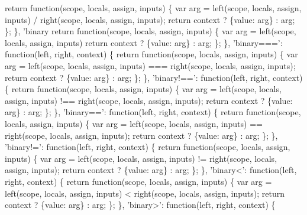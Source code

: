 \begin{DoxyCodeInclude}
{{{    \textcolor{keywordflow}{return} \textcolor{keyword}{function}(scope, locals, assign, inputs) \{
      var arg = left(scope, locals, assign, inputs) / right(scope, locals, assign, inputs);
      \textcolor{keywordflow}{return} context ? \{value: arg\} : arg;
    \};
  \},
  \textcolor{stringliteral}{'binary%
    \textcolor{keywordflow}{return} \textcolor{keyword}{function}(scope, locals, assign, inputs) \{
      var arg = left(scope, locals, assign, inputs) %
      \textcolor{keywordflow}{return} context ? \{value: arg\} : arg;
    \};
  \},
  \textcolor{stringliteral}{'binary==='}: \textcolor{keyword}{function}(left, right, context) \{
    \textcolor{keywordflow}{return} \textcolor{keyword}{function}(scope, locals, assign, inputs) \{
      var arg = left(scope, locals, assign, inputs) === right(scope, locals, assign, inputs);
      \textcolor{keywordflow}{return} context ? \{value: arg\} : arg;
    \};
  \},
  \textcolor{stringliteral}{'binary!=='}: \textcolor{keyword}{function}(left, right, context) \{
    \textcolor{keywordflow}{return} \textcolor{keyword}{function}(scope, locals, assign, inputs) \{
      var arg = left(scope, locals, assign, inputs) !== right(scope, locals, assign, inputs);
      \textcolor{keywordflow}{return} context ? \{value: arg\} : arg;
    \};
  \},
  \textcolor{stringliteral}{'binary=='}: \textcolor{keyword}{function}(left, right, context) \{
    \textcolor{keywordflow}{return} \textcolor{keyword}{function}(scope, locals, assign, inputs) \{
      var arg = left(scope, locals, assign, inputs) == right(scope, locals, assign, inputs);
      \textcolor{keywordflow}{return} context ? \{value: arg\} : arg;
    \};
  \},
  \textcolor{stringliteral}{'binary!='}: \textcolor{keyword}{function}(left, right, context) \{
    \textcolor{keywordflow}{return} \textcolor{keyword}{function}(scope, locals, assign, inputs) \{
      var arg = left(scope, locals, assign, inputs) != right(scope, locals, assign, inputs);
      \textcolor{keywordflow}{return} context ? \{value: arg\} : arg;
    \};
  \},
  \textcolor{stringliteral}{'binary<'}: \textcolor{keyword}{function}(left, right, context) \{
    \textcolor{keywordflow}{return} \textcolor{keyword}{function}(scope, locals, assign, inputs) \{
      var arg = left(scope, locals, assign, inputs) < right(scope, locals, assign, inputs);
      \textcolor{keywordflow}{return} context ? \{value: arg\} : arg;
    \};
  \},
  \textcolor{stringliteral}{'binary>'}: \textcolor{keyword}{function}(left, right, context) \{
}}}}
\end{DoxyCodeInclude}
